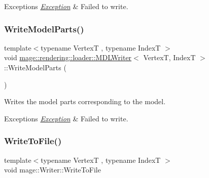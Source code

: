 \begin{DoxyExceptions}{Exceptions}
{\em \mbox{\hyperlink{classmage_1_1_exception}{Exception}}} & Failed to write. \\
\hline
\end{DoxyExceptions}
\mbox{\label{classmage_1_1rendering_1_1loader_1_1_m_d_l_writer_a8fcd997a51d7a46149596d332ebdb8e1}} 
\subsubsection{\texorpdfstring{Write\+Model\+Parts()}{WriteModelParts()}}
{\footnotesize\ttfamily template$<$typename VertexT , typename IndexT $>$ \\
void \mbox{\hyperlink{classmage_1_1rendering_1_1loader_1_1_m_d_l_writer}{mage\+::rendering\+::loader\+::\+M\+D\+L\+Writer}}$<$ VertexT, IndexT $>$\+::Write\+Model\+Parts (\begin{DoxyParamCaption}{ }\end{DoxyParamCaption})\hspace{0.3cm}{\ttfamily [private]}}

Writes the model parts corresponding to the model.


\begin{DoxyExceptions}{Exceptions}
{\em \mbox{\hyperlink{classmage_1_1_exception}{Exception}}} & Failed to write. \\
\hline
\end{DoxyExceptions}
\mbox{\label{classmage_1_1rendering_1_1loader_1_1_m_d_l_writer_a9af5416468b0a51983d07aec8061eb27}} 
\subsubsection{\texorpdfstring{Write\+To\+File()}{WriteToFile()}}
{\footnotesize\ttfamily template$<$typename VertexT , typename IndexT $>$ \\
void mage\+::\+Writer\+::\+Write\+To\+File}

